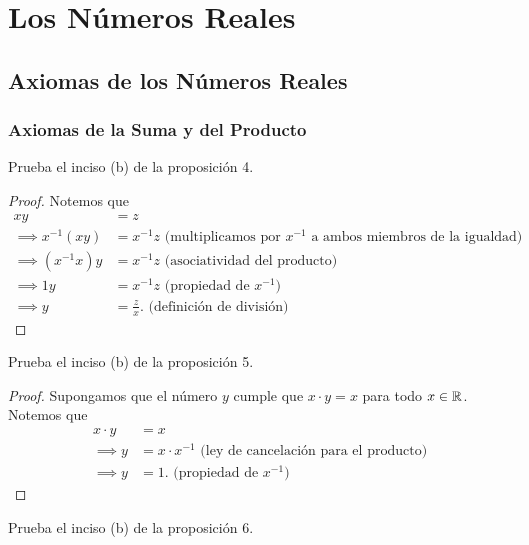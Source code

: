 \documentclass[12pt,a4paper]{book}
\begin{document}
    \chapter{Los Números Reales}

    \section{Axiomas de los Números Reales}

    \subsection{Axiomas de la Suma y del Producto}

    \begin{ejercicio}
        Prueba el inciso (b) de la proposición 4.
    \end{ejercicio}

    \begin{proof}
        Notemos que
        \begin{align*}
            xy&=z\\
            \implies x^{-1}(xy)&=x^{-1}z\text{ (multiplicamos por $x^{-1}$ a ambos miembros de la igualdad)}\\
            \implies (x^{-1}x)y&=x^{-1}z\text{ (asociatividad del producto)}\\
            \implies 1y&=x^{-1}z\text{ (propiedad de $x^{-1}$)}\\
            \implies y&=\frac{z}{x}.\text{ (definición de división)}
        \end{align*}
    \end{proof}

    \begin{ejercicio}
        Prueba el inciso (b) de la proposición 5.
    \end{ejercicio}

    \begin{proof}
        Supongamos que el número $y$ cumple que $x\cdot y=x$ para todo $x\in\mathbb{R}$. Notemos que
        \begin{align*}
            x\cdot y&=x\\
            \implies y&=x\cdot x^{-1}\text{ (ley de cancelación para el producto)}\\
            \implies y&=1.\text{ (propiedad de $x^{-1}$)}
        \end{align*}
    \end{proof}

    \begin{ejercicio}
        Prueba el inciso (b) de la proposición 6.
    \end{ejercicio}
\end{document}
